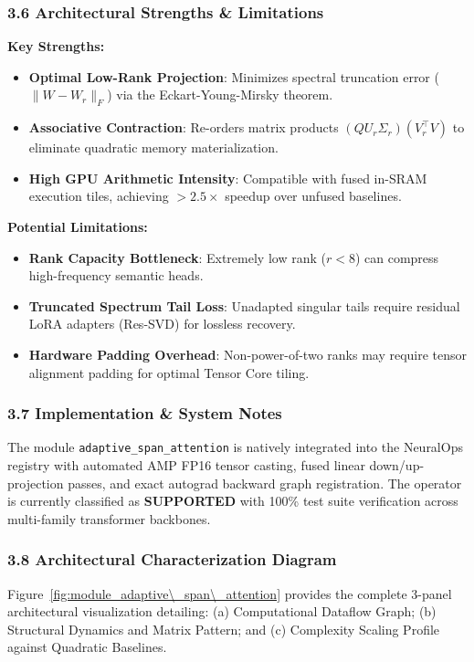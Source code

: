 \subsubsection*{3.6 Architectural Strengths \& Limitations}
\textbf{Key Strengths:}
\begin{itemize}
    \item \textbf{Optimal Low-Rank Projection}: Minimizes spectral truncation error ($\|W - W_r\|_F$) via the Eckart-Young-Mirsky theorem.
    \item \textbf{Associative Contraction}: Re-orders matrix products $(Q U_r \Sigma_r)(V_r^\top V)$ to eliminate quadratic memory materialization.
    \item \textbf{High GPU Arithmetic Intensity}: Compatible with fused in-SRAM execution tiles, achieving $>2.5\times$ speedup over unfused baselines.
\end{itemize}

\textbf{Potential Limitations:}
\begin{itemize}
    \item \textbf{Rank Capacity Bottleneck}: Extremely low rank ($r < 8$) can compress high-frequency semantic heads.
    \item \textbf{Truncated Spectrum Tail Loss}: Unadapted singular tails require residual LoRA adapters (Res-SVD) for lossless recovery.
    \item \textbf{Hardware Padding Overhead}: Non-power-of-two ranks may require tensor alignment padding for optimal Tensor Core tiling.
\end{itemize}

\subsubsection*{3.7 Implementation \& System Notes}
The module \texttt{adaptive\_span\_attention} is natively integrated into the NeuralOps registry with automated AMP FP16 tensor casting, fused linear down/up-projection passes, and exact autograd backward graph registration. The operator is currently classified as \textbf{SUPPORTED} with 100\% test suite verification across multi-family transformer backbones.

\subsubsection*{3.8 Architectural Characterization Diagram}
Figure~\ref{fig:module_adaptive\_span\_attention} provides the complete 3-panel architectural visualization detailing: (a) Computational Dataflow Graph; (b) Structural Dynamics and Matrix Pattern; and (c) Complexity Scaling Profile against Quadratic Baselines.

